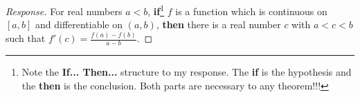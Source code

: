 \documentclass[11pt,fleqn]{exam}
\begin{document}
\begin{questions}

\addpoints
\question
\vspace*{-130pt}
\begin{changemargin}{0pt}{137.4803pt}
\begin{proof}[Response] For real numbers $a<b$, \textbf{if}\footnote{Note the \textbf{If... Then...} structure to my response. The \textbf{if} is the hypothesis and the \textbf{then} is the conclusion. Both parts are necessary to any theorem!!!} $f$ is a function which is continuous on $[a,b]$ and differentiable on $(a,b)$, \textbf{then} there is a real number $c$ with $a<c<b$ such that $f'(c)=\frac{f(a)-f(b)}{a-b}$. \end{proof}\end{changemargin}\vspace{5em}\begin{parts}\setcounter{partno}{1}

\end{parts}
\end{questions}
\end{document}
